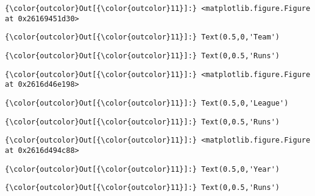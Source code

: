 \documentclass[11pt]{article}
\begin{document}
\begin{Verbatim}[commandchars=\\\{\}]
{\color{outcolor}Out[{\color{outcolor}11}]:} <matplotlib.figure.Figure at 0x26169451d30>
\end{Verbatim}
            
\begin{Verbatim}[commandchars=\\\{\}]
{\color{outcolor}Out[{\color{outcolor}11}]:} Text(0.5,0,'Team')
\end{Verbatim}
            
\begin{Verbatim}[commandchars=\\\{\}]
{\color{outcolor}Out[{\color{outcolor}11}]:} Text(0,0.5,'Runs')
\end{Verbatim}
            
\begin{Verbatim}[commandchars=\\\{\}]
{\color{outcolor}Out[{\color{outcolor}11}]:} <matplotlib.figure.Figure at 0x2616d46e198>
\end{Verbatim}
            
\begin{Verbatim}[commandchars=\\\{\}]
{\color{outcolor}Out[{\color{outcolor}11}]:} Text(0.5,0,'League')
\end{Verbatim}
            
\begin{Verbatim}[commandchars=\\\{\}]
{\color{outcolor}Out[{\color{outcolor}11}]:} Text(0,0.5,'Runs')
\end{Verbatim}
            
\begin{Verbatim}[commandchars=\\\{\}]
{\color{outcolor}Out[{\color{outcolor}11}]:} <matplotlib.figure.Figure at 0x2616d494c88>
\end{Verbatim}
            
\begin{Verbatim}[commandchars=\\\{\}]
{\color{outcolor}Out[{\color{outcolor}11}]:} Text(0.5,0,'Year')
\end{Verbatim}
            
\begin{Verbatim}[commandchars=\\\{\}]
{\color{outcolor}Out[{\color{outcolor}11}]:} Text(0,0.5,'Runs')
\end{Verbatim}
            
\end{document}

